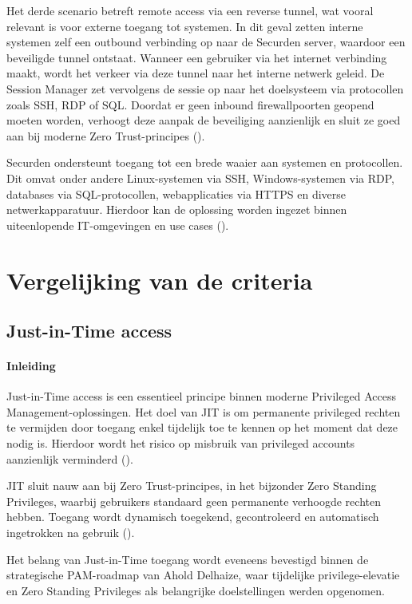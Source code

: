 Het derde scenario betreft remote access via een reverse tunnel, wat vooral relevant is voor externe toegang tot systemen. In dit geval zetten interne systemen zelf een outbound verbinding op naar de Securden server, waardoor een beveiligde tunnel ontstaat. Wanneer een gebruiker via het internet verbinding maakt, wordt het verkeer via deze tunnel naar het interne netwerk geleid. De Session Manager zet vervolgens de sessie op naar het doelsysteem via protocollen zoals SSH, RDP of SQL. Doordat er geen inbound firewallpoorten geopend moeten worden, verhoogt deze aanpak de beveiliging aanzienlijk en sluit ze goed aan bij moderne Zero Trust-principes (\cite{securden_remote_gateway,nist2020}).

Securden ondersteunt toegang tot een brede waaier aan systemen en protocollen. Dit omvat onder andere Linux-systemen via SSH, Windows-systemen via RDP, databases via SQL-protocollen, webapplicaties via HTTPS en diverse netwerkapparatuur. Hierdoor kan de oplossing worden ingezet binnen uiteenlopende IT-omgevingen en use cases (\cite{securden_pam}).


\section{Vergelijking van de criteria}
\subsection{Just-in-Time access}
\paragraph{Inleiding}
Just-in-Time access is een essentieel principe binnen moderne Privileged Access Management-oplossingen. Het doel van JIT is om permanente privileged rechten te vermijden door toegang enkel tijdelijk toe te kennen op het moment dat deze nodig is. Hierdoor wordt het risico op misbruik van privileged accounts aanzienlijk verminderd (\cite{nist2020}).

JIT sluit nauw aan bij Zero Trust-principes, in het bijzonder Zero Standing Privileges, waarbij gebruikers standaard geen permanente verhoogde rechten hebben. Toegang wordt dynamisch toegekend, gecontroleerd en automatisch ingetrokken na gebruik (\cite{nist2020}).

Het belang van Just-in-Time toegang wordt eveneens bevestigd binnen de strategische PAM-roadmap van Ahold Delhaize, waar tijdelijke privilege-elevatie en Zero Standing Privileges als belangrijke doelstellingen werden opgenomen.

